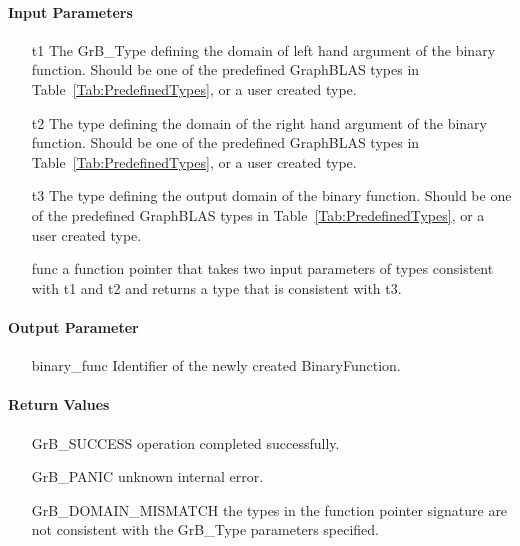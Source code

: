 \paragraph{Input Parameters}

\begin{itemize}[leftmargin=1.1in]
    \item[{\sf t1}] The GrB\_Type defining the domain of left hand argument of
    the binary function. Should be one of the predefined
    GraphBLAS types in Table~\ref{Tab:PredefinedTypes}, or a user created type.
    \item[{\sf t2}] The type defining the domain of the right hand argument of
    the binary function. Should be one of the predefined
    GraphBLAS types in Table~\ref{Tab:PredefinedTypes}, or a user created type.
    \item[{\sf t3}] The type defining the output domain of the binary
    function. Should be one of the predefined
    GraphBLAS types in Table~\ref{Tab:PredefinedTypes}, or a user created type.
    \item[{\sf func}] a function pointer that takes two input parameters of types consistent
    with t1 and t2 and returns a type that is consistent with t3.
\end{itemize}

\paragraph{Output Parameter}

\begin{itemize}[leftmargin=1.1in]
    \item[{\sf binary\_func}] Identifier of the newly created BinaryFunction.
\end{itemize}

\paragraph{Return Values}

\begin{itemize}[leftmargin=2.1in]
\item[{\sf GrB\_SUCCESS}]           operation completed successfully.
\item[{\sf GrB\_PANIC}]             unknown internal error.
\item[{\sf GrB\_DOMAIN\_MISMATCH}]  the types in the function pointer signature are not   
                                    consistent with the {\sf GrB\_Type} parameters specified.
\end{itemize}

